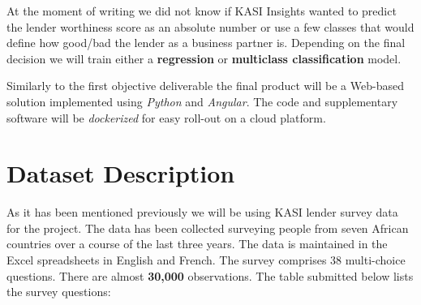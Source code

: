At the moment of writing we did not know if KASI Insights wanted to
predict the lender worthiness score as an absolute number or use a few
classes that would define how good/bad the lender as a business partner
is. Depending on the final decision we will train either a
\textbf{regression} or \textbf{multiclass classification} model.

Similarly to the first objective deliverable the final product will be a
Web-based solution implemented using \emph{Python} and \emph{Angular}.
The code and supplementary software will be \emph{dockerized} for easy
roll-out on a cloud platform.

\hypertarget{dataset-description}{%
\section{Dataset Description}\label{dataset-description}}

As it has been mentioned previously we will be using KASI lender survey
data for the project. The data has been collected surveying people from
seven African countries over a course of the last three years. The data
is maintained in the Excel spreadsheets in English and French. The
survey comprises 38 multi-choice questions. There are almost
\textbf{30,000} observations. The table submitted below lists the survey
questions:

